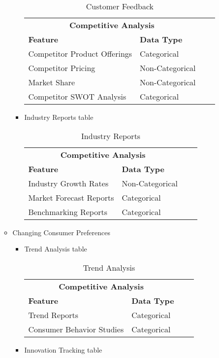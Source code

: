 \documentclass[12pt,a4Paper]{article}
\begin{document}
\begin{enumerate}
\begin{itemize}
\begin{itemize}
		\begin{table}
		\begin{tabular}{llll}\hline
		\multicolumn{2}{c}{\textbf{Competitive Analysis}} & &\\
		\textbf{Feature} & \textbf{Data Type}\\\hline
		Competitor Product Offerings & Categorical\\
		Competitor Pricing & Non-Categorical\\
		Market Share & Non-Categorical\\
		Competitor SWOT Analysis & Categorical\\\hline
		\end{tabular}
		\centering
		\caption{Customer Feedback}
		\end{table}	
		\item Industry Reports table
		\begin{table}
		\begin{tabular}{llll}\hline
		\multicolumn{2}{c}{\textbf{Competitive Analysis}} & &\\
		\textbf{Feature} & \textbf{Data Type}\\\hline
		Industry Growth Rates & Non-Categorical\\
		Market Forecast Reports & Categorical\\
		Benchmarking Reports & Categorical\\\hline
		\end{tabular}
		\centering
		\caption{Industry Reports}
		\end{table}	
		\end{itemize}
	\item Changing Consumer Preferences
		\begin{itemize}
		\item Trend Analysis table
		\begin{table}
		\begin{tabular}{llll}\hline
		\multicolumn{2}{c}{\textbf{Competitive Analysis}} & &\\
		\textbf{Feature} & \textbf{Data Type}\\\hline
		Trend Reports & Categorical\\
		Consumer Behavior Studies & Categorical\\\hline
		\end{tabular}
		\centering
		\caption{Trend Analysis}
		\end{table}
		\item Innovation Tracking table
		\begin{table}
		\begin{tabular}{llll}\hline

\end{tabular}
\end{table}
\end{itemize}
\end{itemize}
\end{enumerate}
\end{document}
